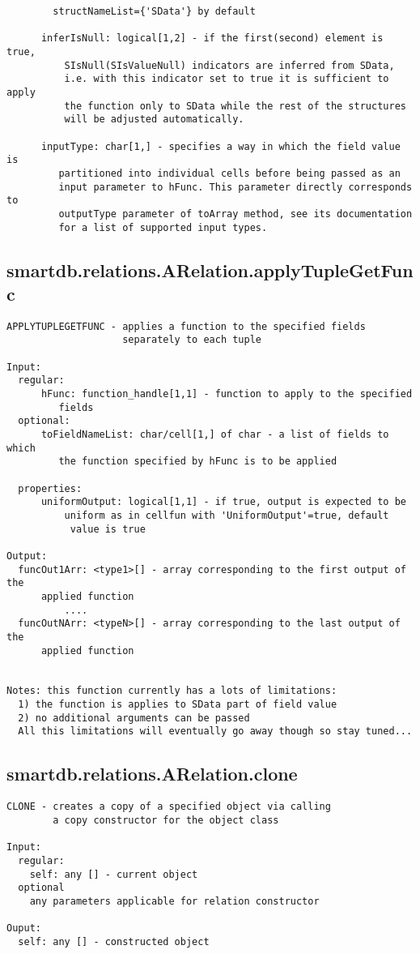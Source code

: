 \begin{verbatim}
        structNameList={'SData'} by default

      inferIsNull: logical[1,2] - if the first(second) element is true,
          SIsNull(SIsValueNull) indicators are inferred from SData,
          i.e. with this indicator set to true it is sufficient to apply
          the function only to SData while the rest of the structures
          will be adjusted automatically.

      inputType: char[1,] - specifies a way in which the field value is
         partitioned into individual cells before being passed as an
         input parameter to hFunc. This parameter directly corresponds to
         outputType parameter of toArray method, see its documentation
         for a list of supported input types.
\end{verbatim}
\subsection{\texorpdfstring{smartdb.relations.ARelation.applyTupleGetFunc}{applyTupleGetFunc}}\label{method:smartdb.relations.ARelation.applyTupleGetFunc}
\begin{verbatim}
APPLYTUPLEGETFUNC - applies a function to the specified fields
                    separately to each tuple

Input:
  regular:
      hFunc: function_handle[1,1] - function to apply to the specified
         fields
  optional:
      toFieldNameList: char/cell[1,] of char - a list of fields to which
         the function specified by hFunc is to be applied

  properties:
      uniformOutput: logical[1,1] - if true, output is expected to be
          uniform as in cellfun with 'UniformOutput'=true, default
           value is true

Output:
  funcOut1Arr: <type1>[] - array corresponding to the first output of the
      applied function
          ....
  funcOutNArr: <typeN>[] - array corresponding to the last output of the
      applied function


Notes: this function currently has a lots of limitations:
  1) the function is applies to SData part of field value
  2) no additional arguments can be passed
  All this limitations will eventually go away though so stay tuned...
\end{verbatim}
\subsection{\texorpdfstring{smartdb.relations.ARelation.clone}{clone}}\label{method:smartdb.relations.ARelation.clone}
\begin{verbatim}
CLONE - creates a copy of a specified object via calling
        a copy constructor for the object class

Input:
  regular:
    self: any [] - current object
  optional
    any parameters applicable for relation constructor

Ouput:
  self: any [] - constructed object
\end{verbatim}
